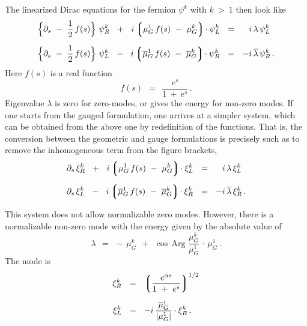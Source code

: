 \documentclass[epsfig,12pt]{article}
\def\beq{\begin{equation}}
\def\eeq{\end{equation}}
\def\beq{\begin{equation}}
\def\eeq{\end{equation}}
\newcommand{\p}{\partial}
\newcommand{\ov}{\overline}
\newcommand{\lgr}{\left\lgroup}
\newcommand{\rgr}{\right\rgroup}
\begin{document}
	The linearized Dirac equations for the fermion $ \psi^k $ with $ k ~>~ 1 $ then look like
\begin{align}
%
\notag
	\Big\{ \p_s  ~-~ \frac{1}{2}\, f(s) \Big\}\,\, \psi_R^k   ~~+~~  i \lgr  \mu_G^1\, f(s)  ~-~  \mu_G^k \rgr\! \cdot \psi_L^k  
	& ~~=~~ \phantom{-} i\, \lambda\, \psi_L^k   \\[2mm]
%
	\Big\{ \p_s  ~-~ \frac{1}{2}\, f(s) \Big\}\,\, \psi_L^k   ~~-~~  i \lgr \ov{\mu}{}_G^1\, f(s)  ~-~ \ov{\mu}{}_G^k \rgr\! \cdot \psi_R^k 
	& ~~=~~ - i\, \ov{\lambda}\, \psi_R^k \,.
\end{align}
	Here $ f(s) $ is a real function
\beq
	f(s) ~~=~~ \frac{     e^s     }
 	                { 1  ~+~  e^s }\,.
\eeq
	Eigenvalue $ \lambda $ is zero for zero-modes, or gives the energy for non-zero modes.
	If one starts from the gauged formulation, one arrives at a simpler system, which can be obtained from the
	above one by redefinition of the functions.
	That is, the conversion between the geometric and gauge formulations is precisely such as to remove the inhomogeneous term from the
	figure brackets,
\begin{align}
%
\notag
	\p_s\, \xi_R^k  ~~+~~  i \lgr \mu_G^1\, f(s) ~-~ \mu_G^k \rgr\! \cdot \xi_L^k  & ~~=~~ \phantom{-} i\, \lambda\, \xi_L^k \\[2mm]
%
	\p_s\, \xi_L^k  ~~-~~  i \lgr \ov{\mu}{}_G^1\, f(s) ~-~ \ov{\mu}{}_G^k \rgr\! \cdot \xi_R^k & ~~=~~ - i\, \ov{\lambda}\, \xi_R^k \,.
\end{align}
       
	This system does not allow normalizable zero modes.
	However, there is a normalizable non-zero mode with the energy given by the absolute value of 
\beq
       \lambda  ~~=~~  -\, \mu_G^k  ~~+~~ \cos\, \text{Arg}\,\, \frac{\mu_G^k}{\mu_G^1}  \,\cdot\, \mu_G^1\,.
\eeq
	The mode is
\begin{align}
%
\notag
	\xi_R^k  & ~~=~~  \lgr \frac{  e^{\alpha s}  }
	                            {   1 ~+~ e^s    }  \rgr^{ 1/2 }  \\[2mm]
%
	\xi_L^k  & ~~=~~  - i\, \frac{ \ov{\mu}{}_G^1 }
	                             {  | \mu_G^1 |   } \cdot \xi_R^k\,.
\end{align}
	
\end{document}
